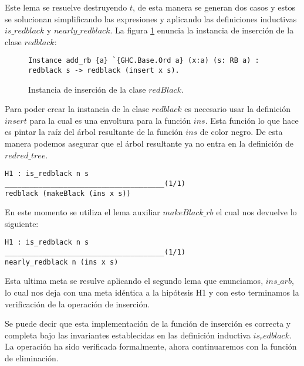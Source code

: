 Este lema se resuelve destruyendo $t$, de esta manera se generan dos casos y estos se solucionan
simplificando las expresiones y aplicando las definiciones inductivas $is\_redblack$ y
$nearly\_redblack$.
La figura \ref{instance_ins} enuncia la instancia de inserci\'on de la clase $redblack$:

\begin{figure}
\centering
\captionsetup{justification=centering}
\begin{verbatim}
Instance add_rb {a} `{GHC.Base.Ord a} (x:a) (s: RB a) :
redblack s -> redblack (insert x s).
\end{verbatim}
\caption{Instancia de inserci\'on de la clase $redBlack$.}
\label{instance_ins}
\end{figure}

Para poder crear la instancia de la clase $redblack$ es necesario usar la definici\'on $insert$
para la cual es una envoltura para la funci\'on $ins$. Esta funci\'on lo que hace es pintar la
ra\'iz del \'arbol resultante de la funci\'on $ins$ de color negro. De esta manera podemos
asegurar que el \'arbol resultante ya no entra en la definici\'on de $redred\_tree$.

\begin{verbatim}
H1 : is_redblack n s
______________________________________(1/1)
redblack (makeBlack (ins x s))
\end{verbatim}

En este momento se utiliza el lema auxiliar $makeBlack\_rb$ el cual nos devuelve lo siguiente:

\begin{verbatim}
H1 : is_redblack n s
______________________________________(1/1)
nearly_redblack n (ins x s)
\end{verbatim}

Esta ultima meta se resulve aplicando el segundo lema que enunciamos, $ins\_arb$, lo cual nos deja
con una meta idéntica a la hipótesis H1 y con esto terminamos la verificaci\'on de la operaci\'on
de inserci\'on.

Se puede decir que esta implementaci\'on de la funci\'on de inserci\'on es correcta y completa
bajo las invariantes establecidas en las definici\'on inductiva $is_redblack$. La operaci\'on ha
sido verificada formalmente, ahora continuaremos con la funci\'on de eliminaci\'on.
